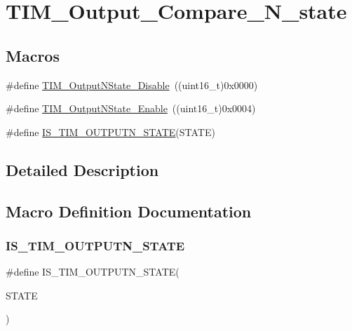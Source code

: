 \hypertarget{group___t_i_m___output___compare___n__state}{}\section{T\+I\+M\+\_\+\+Output\+\_\+\+Compare\+\_\+\+N\+\_\+state}
\label{group___t_i_m___output___compare___n__state}
\subsection*{Macros}
\begin{DoxyCompactItemize}
\item 
\#define \mbox{\hyperlink{group___t_i_m___output___compare___n__state_gade8506a50fd6ba58273e9da81f6b0b54}{T\+I\+M\+\_\+\+Output\+N\+State\+\_\+\+Disable}}~((uint16\+\_\+t)0x0000)
\item 
\#define \mbox{\hyperlink{group___t_i_m___output___compare___n__state_gac4c08f9d66ce138c6978668020526c6f}{T\+I\+M\+\_\+\+Output\+N\+State\+\_\+\+Enable}}~((uint16\+\_\+t)0x0004)
\item 
\#define \mbox{\hyperlink{group___t_i_m___output___compare___n__state_ga81e27a982d9707f699451f30314c4274}{I\+S\+\_\+\+T\+I\+M\+\_\+\+O\+U\+T\+P\+U\+T\+N\+\_\+\+S\+T\+A\+TE}}(S\+T\+A\+TE)
\end{DoxyCompactItemize}


\subsection{Detailed Description}


\subsection{Macro Definition Documentation}
\mbox{\label{group___t_i_m___output___compare___n__state_ga81e27a982d9707f699451f30314c4274}} 
\subsubsection{\texorpdfstring{IS\_TIM\_OUTPUTN\_STATE}{IS\_TIM\_OUTPUTN\_STATE}}
{\footnotesize\ttfamily \#define I\+S\+\_\+\+T\+I\+M\+\_\+\+O\+U\+T\+P\+U\+T\+N\+\_\+\+S\+T\+A\+TE(\begin{DoxyParamCaption}\item[{}]{S\+T\+A\+TE }\end{DoxyParamCaption})}

